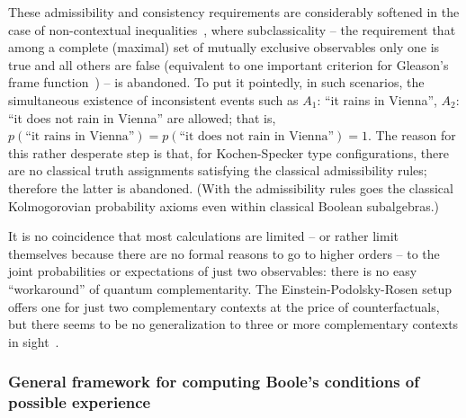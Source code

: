 These admissibility and consistency requirements are considerably softened in the case of non-contextual inequalities~\cite{cabello:210401},
where subclassicality
-- the requirement that among a complete (maximal) set of mutually exclusive observables only one is true and all others are false
(equivalent to one important criterion for Gleason's frame function~\cite{Gleason})
--
is abandoned.
To put it pointedly, in such scenarios, the simultaneous existence of inconsistent events such as
$A_1$: ``it rains in Vienna'',
$A_2$: ``it does not rain in Vienna''
are allowed; that is,
$p(\text{``it rains in Vienna''}) = p(\text{``it does not rain in Vienna''}) =1$.
The reason for this rather desperate step is that, for Kochen-Specker type configurations,
there are no classical truth assignments satisfying the classical admissibility rules;
therefore the latter is abandoned.
(With the admissibility rules goes the classical Kolmogorovian probability axioms even within classical Boolean subalgebras.)


It is no coincidence that most calculations are limited -- or rather limit themselves because there are no formal reasons to go to higher orders
--
to the joint probabilities or expectations of just two observables:
there is no easy ``workaround'' of quantum complementarity.
The Einstein-Podolsky-Rosen setup~\cite{epr}
offers one for just two complementary contexts at the price of counterfactuals,
but there seems to be no generalization to three or more complementary contexts in sight~\cite{schimpf-svozil}.


\subsubsection{General framework for computing Boole's conditions of possible experience}
\label{2017-b-gfcbcpe}

